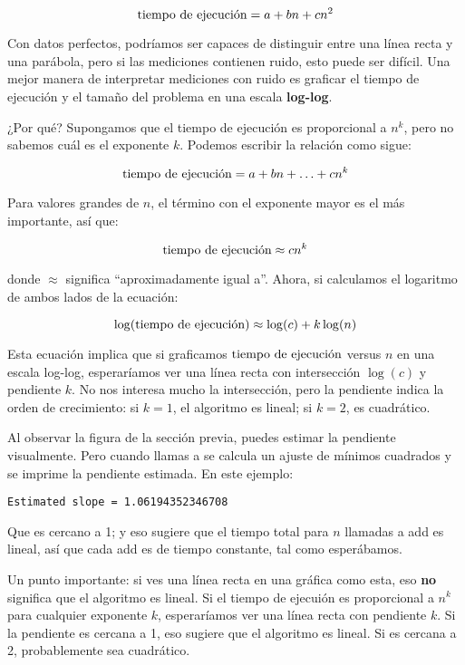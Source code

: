 \documentclass[12pt]{book}
\theoremstyle{exercise}
\begin{document}
\[ \runtime = a + b n + c n^2 \]

Con datos perfectos, podríamos ser capaces de distinguir entre una línea
recta y una parábola, pero si las mediciones contienen ruido, esto puede
ser difícil. Una mejor manera de interpretar mediciones con ruido es
graficar el tiempo de ejecución y el tamaño del problema en una
escala \textbf{log-log}.


¿Por qué? Supongamos que el tiempo de ejecución es proporcional
a $n^k$, pero no sabemos cuál es el exponente $k$. Podemos escribir la
relación como sigue:

\[ \runtime = a + b n + \ldots + c n^k \]

Para valores grandes de $n$, el término con el exponente mayor es el
más importante, así que:

\[ \runtime \approx c n^k \]

donde $\approx$ significa ``aproximadamente igual a''. Ahora, si
calculamos el logaritmo de ambos lados de la ecuación:

\[ \log(\runtime) \approx \log(c) + k \log(n) \]

Esta ecuación implica que si graficamos $\runtime$ versus $n$ en una
escala log-log, esperaríamos ver una línea recta con intersección
$\log(c)$ y pendiente $k$. No nos interesa mucho la intersección,
pero la pendiente indica la orden de crecimiento: si
$k=1$, el algoritmo es lineal; si $k=2$, es cuadrático.


Al observar la figura de la sección previa, puedes estimar la
pendiente visualmente. Pero cuando llamas a 
se calcula un ajuste de mínimos cuadrados y se imprime la pendiente
estimada. En este ejemplo:

\begin{verbatim}
Estimated slope = 1.06194352346708
\end{verbatim}

Que es cercano a 1; y eso sugiere que el tiempo total para $n$ llamadas a add
es lineal, así que cada add es de tiempo constante, tal como esperábamos.


Un punto importante: si ves una línea recta en una gráfica como esta,
eso \textbf{no} significa que el algoritmo es lineal. Si el tiempo de ejecuión
es proporcional a $n^k$ para cualquier exponente $k$, esperaríamos ver
una línea recta con pendiente $k$. Si la pendiente es cercana a 1, eso
sugiere que el algoritmo es lineal. Si es cercana a 2, probablemente sea
cuadrático.
\end{document}
